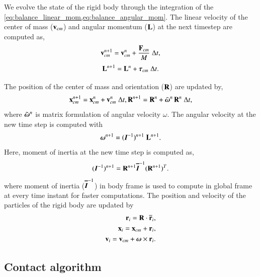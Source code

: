 We evolve the state of the rigid body through the integration of the
\cref{eq:balance_linear_mom,eq:balance_angular_mom}. The linear velocity of the
center of mass ($\mathbf{v}_{cm}$) and angular momentum ($\mathbf{L}$) at the next
timestep are computed as,
\begin{equation}
  \label{eq:lin_vel_cm_update}
  \mathbf{v}_{cm}^{n+1} = \mathbf{v}_{cm}^{n} + \frac{\mathbf{F}_{cm}}{M} \; \Delta t,
\end{equation}
\begin{equation}
  \label{eq:ang_mom_update}
  \mathbf{L}^{n+1} = \mathbf{L}^{n} + \boldsymbol{\tau}_{cm} \; \Delta t.
\end{equation}

The position of the center of mass and orientation ($\mathbf{R}$) are updated
by,
\begin{equation}
  \label{eq:lin_pos_cm_update}
  \mathbf{x}_{cm}^{n+1} = \mathbf{x}_{cm}^{n} + \mathbf{v}_{cm}^{n} \; \Delta t,\\
  \mathbf{R}^{n+1} = \mathbf{R}^{n} + \tilde{\boldsymbol{\omega}}^{n} \, \mathbf{R}^{n} \; \Delta t,
\end{equation}
where $\tilde{\boldsymbol{\omega}}^{n}$ is matrix formulation of angular velocity
$\omega$. The angular velocity at the new time step is computed with
\begin{equation}
  \label{eq:ang_velocity_update}
  \boldsymbol{\omega}^{n+1} = (\textit{\ensuremath{\boldsymbol{I}}}^{-1})^{n+1} \; \mathbf{L}^{n+1}.
\end{equation}
Here, moment of inertia at the new time step is computed as,
\begin{equation}
  \label{eq:moi_update}
  (\textit{\ensuremath{\boldsymbol{I}}}^{-1})^{n+1} = \mathbf{R}^{n+1} \textit{\ensuremath{\boldsymbol{\overline{I}}}}^{-1} (\mathbf{R}^{n+1})^T.
\end{equation}
where moment of inertia ($\textit{\ensuremath{\boldsymbol{\overline{I}}}}^{-1}$) in body frame is
used to compute in global frame at every time instant for faster computations.
The position and velocity of the particles of the rigid body are updated by
\begin{eqnarray}
  \label{eq:rb_particle_pos_update}
  \mathbf{r}_i = \mathbf{R} \cdot \overline{\mathbf{r}}_{i},\\
  \mathbf{x}_i = \mathbf{x}_{cm} + \mathbf{r}_{i},\\
  \mathbf{v}_i = \mathbf{v}_{cm} + \boldsymbol{\omega} \times \mathbf{r}_{i}.
\end{eqnarray}


\FloatBarrier%
\subsection{Contact algorithm}
\label{rfc:sec:contact-algorithm}

